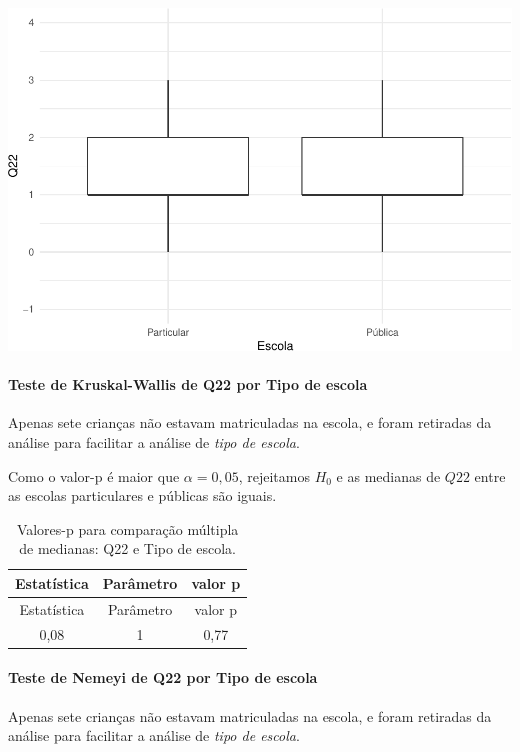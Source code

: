 \documentclass[]{article}
\let\oldparagraph\paragraph
\renewcommand{\paragraph}[1]{\oldparagraph{#1}\mbox{}}
\begin{document}
\begin{center}\includegraphics[width=0.75\linewidth]{relatorio_files/figure-latex/unnamed-chunk-403-1} \end{center}

\hypertarget{teste-de-kruskal-wallis-de-q22-por-tipo-de-escola}{%
\paragraph{Teste de Kruskal-Wallis de Q22 por Tipo de escola}\label{teste-de-kruskal-wallis-de-q22-por-tipo-de-escola}}

Apenas sete crianças não estavam matriculadas na escola, e foram retiradas da análise para facilitar a análise de \emph{tipo de escola}.

Como o valor-p é maior que \(\alpha=0,05\), rejeitamos \(H_0\) e as medianas de \(Q22\) entre as escolas particulares e públicas são iguais.

\begin{longtable}[]{@{}ccc@{}}
\caption{\label{tab:unnamed-chunk-404}Valores-p para comparação múltipla de medianas: Q22 e Tipo de escola.}\tabularnewline
\toprule
Estatística & Parâmetro & valor p\tabularnewline
\midrule
\endfirsthead
\toprule
Estatística & Parâmetro & valor p\tabularnewline
\midrule
\endhead
0,08 & 1 & 0,77\tabularnewline
\bottomrule
\end{longtable}

\hypertarget{teste-de-nemeyi-de-q22-por-tipo-de-escola}{%
\paragraph{Teste de Nemeyi de Q22 por Tipo de escola}\label{teste-de-nemeyi-de-q22-por-tipo-de-escola}}

Apenas sete crianças não estavam matriculadas na escola, e foram retiradas da análise para facilitar a análise de \emph{tipo de escola}.
\end{document}
